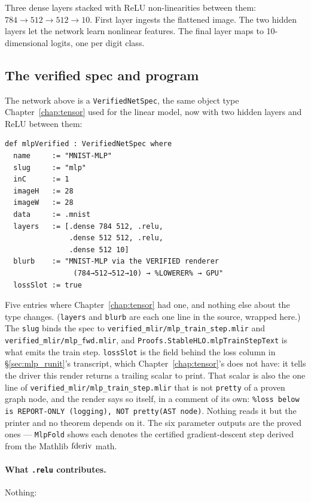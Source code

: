 Three dense layers stacked with ReLU non-linearities between them:
$784 \to 512 \to 512 \to 10$. First layer ingests the flattened
image. The two hidden layers let the network learn nonlinear
features. The final layer maps to 10-dimensional logits, one per
digit class.

\subsection*{The verified spec and program}

The network above is a \texttt{VerifiedNetSpec}, the same object type
Chapter~\ref{chap:tensor} used for the linear model, now with two hidden
layers and ReLU between them:

\begin{verbatim}
def mlpVerified : VerifiedNetSpec where
  name     := "MNIST-MLP"
  slug     := "mlp"
  inC      := 1
  imageH   := 28
  imageW   := 28
  data     := .mnist
  layers   := [.dense 784 512, .relu,
               .dense 512 512, .relu,
               .dense 512 10]
  blurb    := "MNIST-MLP via the VERIFIED renderer
                (784→512→512→10) → %LOWERER% → GPU"
  lossSlot := true
\end{verbatim}

Five entries where Chapter~\ref{chap:tensor} had one, and nothing else
about the type changes. (\texttt{layers} and \texttt{blurb} are each one
line in the source, wrapped here.) The \texttt{slug} binds the spec to
\texttt{verified\_mlir/mlp\_train\_step.mlir} and
\texttt{verified\_mlir/mlp\_fwd.mlir}, and
\texttt{Proofs.StableHLO.mlpTrainStepText} is what emits the train
step. \texttt{lossSlot} is the field behind the loss column in
\S\ref{sec:mlp_runit}'s transcript, which Chapter~\ref{chap:tensor}'s does
not have: it tells the driver this render returns a trailing scalar to
print. That scalar is also the one line of
\texttt{verified\_mlir/mlp\_train\_step.mlir} that is not
\texttt{pretty} of a proven graph node, and the render says so itself, in
a comment of its own: \texttt{\%loss below is REPORT-ONLY (logging), NOT
pretty(AST node)}. Nothing reads it but the printer and no theorem
depends on it. The six parameter outputs are the proved ones ---
\texttt{MlpFold} shows each denotes the certified gradient-descent
step derived from the Mathlib \(\operatorname{fderiv}\) math.

\paragraph{What \texttt{.relu} contributes.} Nothing:

